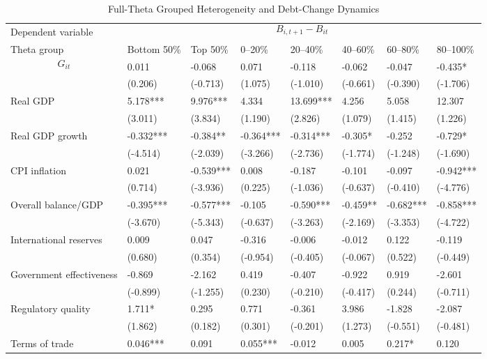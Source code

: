 \begin{table}[H]\centering
\begin{threeparttable}
\caption{Full-Theta Grouped Heterogeneity and Debt-Change Dynamics}
\label{tab:theta_group_heterogeneity_debt}
\scriptsize
\begin{tabularx}{\textwidth}{lYYYYYYY}
\toprule
Dependent variable &  \\
\cmidrule(lr){2-8}
Theta group & Bottom 50\% & Top 50\% & 0--20\% & 20--40\% & 40--60\% & 60--80\% & 80--100\% \\
\midrule
$$G_{it}$$ & 0.011 & -0.068 & 0.071 & -0.118 & -0.062 & -0.047 & -0.435* \\
  & (0.206) & (-0.713) & (1.075) & (-1.010) & (-0.661) & (-0.390) & (-1.706) \\
Real GDP & 5.178*** & 9.976*** & 4.334 & 13.699*** & 4.256 & 5.058 & 12.307 \\
  & (3.011) & (3.834) & (1.190) & (2.826) & (1.079) & (1.415) & (1.226) \\
Real GDP growth & -0.332*** & -0.384** & -0.364*** & -0.314*** & -0.305* & -0.252 & -0.729* \\
  & (-4.514) & (-2.039) & (-3.266) & (-2.736) & (-1.774) & (-1.248) & (-1.690) \\
CPI inflation & 0.021 & -0.539*** & 0.008 & -0.187 & -0.101 & -0.097 & -0.942*** \\
  & (0.714) & (-3.936) & (0.225) & (-1.036) & (-0.637) & (-0.410) & (-4.776) \\
Overall balance/GDP & -0.395*** & -0.577*** & -0.105 & -0.590*** & -0.459** & -0.682*** & -0.858*** \\
  & (-3.670) & (-5.343) & (-0.637) & (-3.263) & (-2.169) & (-3.353) & (-4.722) \\
International reserves & 0.009 & 0.047 & -0.316 & -0.006 & -0.012 & 0.122 & -0.119 \\
  & (0.680) & (0.354) & (-0.954) & (-0.405) & (-0.067) & (0.522) & (-0.449) \\
Government effectiveness & -0.869 & -2.162 & 0.419 & -0.407 & -0.922 & 0.919 & -2.601 \\
  & (-0.899) & (-1.255) & (0.230) & (-0.210) & (-0.417) & (0.244) & (-0.711) \\
Regulatory quality & 1.711* & 0.295 & 0.771 & -0.361 & 3.986 & -1.828 & -2.087 \\
  & (1.862) & (0.182) & (0.301) & (-0.201) & (1.273) & (-0.551) & (-0.481) \\
Terms of trade & 0.046*** & 0.091 & 0.055*** & -0.012 & 0.005 & 0.217* & 0.120 \\

\end{tabularx}
\end{threeparttable}
\end{table}
